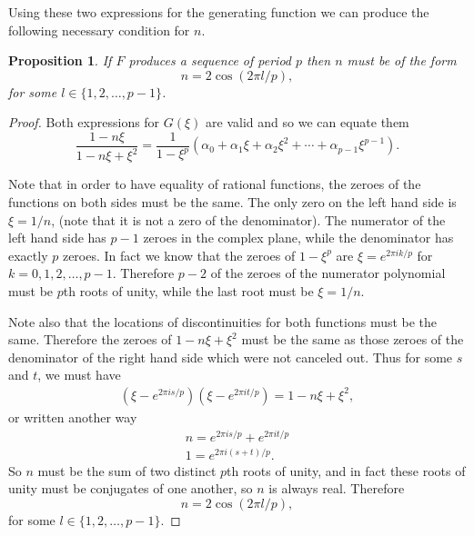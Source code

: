 \documentclass[12pt]{article}
\newtheorem{proposition}{Proposition}
\begin{document}
Using these two expressions for the generating function we can produce the following necessary condition for $n$. 
\begin{proposition} 
\label{must}
If $F$ produces a sequence of period $p$ then $n$ must be of the form
\begin{equation*}
n= 2 \cos(2 \pi l/p), 
\end{equation*}
for some $l \in \{1,2, \ldots, p-1\}$. 
\end{proposition}
\begin{proof}
Both expressions for $G(\xi)$ are valid and so we can equate them 
\begin{equation*}
\frac{ 1 - n\xi}{1 - n \xi + \xi^2} = \frac{1}{1- \xi^p} (\alpha_0 + \alpha_1 \xi + \alpha_2 \xi^2 + \cdots + \alpha_{p-1} \xi^{p-1}).
\end{equation*}

Note that in order to have equality of rational functions, the zeroes of the functions on both sides must be the same. 
The only zero on the left hand side is $\xi = 1/n$, (note that it is not a zero of the denominator). The numerator of the left hand side has $p-1$ zeroes in the complex plane, while the denominator has exactly $p$ zeroes. In fact we know that the zeroes of $1 - \xi^p$ are $\xi = e^{2 \pi i k/p}$ for $k=0,1,2, \ldots, p-1$. Therefore $p-2$ of the zeroes of the numerator polynomial must be $p$th roots of unity, while the last root must be $\xi = 1/n$. 

Note also that the locations of discontinuities for both functions must be the same. Therefore the zeroes of $1-n\xi + \xi^2$ must be the same as those zeroes of the denominator of the right hand side which were not canceled out. Thus for some $s$ and $t$, we must have 
\begin{align*}
(\xi - e^{2 \pi i s/p})(\xi - e^{2 \pi i t/p}) = 1 - n \xi + \xi^2,
\end{align*}
or written another way
\begin{align*}
n = e^{2 \pi i s/p} + e^{2 \pi i t/p} \\
1 = e^{2 \pi i (s+t)/p}.
\end{align*}
So $n$ must be the sum of two distinct $p$th roots of unity, and in fact these roots of unity must be conjugates of one another, so $n$ is always real. Therefore  
\begin{equation*}
n= 2 \cos(2 \pi l/p), 
\end{equation*}
for some $l \in \{1,2, \ldots, p-1\}$. 
\end{proof}
\end{document}
